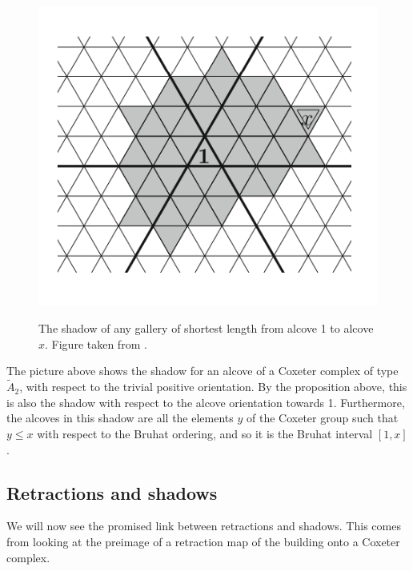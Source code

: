 \documentclass[11pt]{article}
\begin{document}
\begin{figure}[!htbp]
    
    \begin{center}
        \includegraphics[scale=0.6]{Screenshot 2023-03-07 133912.png}\\
    \end{center}
    \caption{The shadow of any gallery of shortest length from alcove 1 to alcove $x$. Figure taken from \cite[p.141]{SHA}.}
\end{figure}

\begin{example}
    The picture above shows the shadow for an alcove of a Coxeter complex of type $\tilde{A}_2$, with respect to the trivial positive orientation. By the proposition above, this is also the shadow with respect to the alcove orientation towards 1. Furthermore, the alcoves in this shadow are all the elements $y$ of the Coxeter group such that $y\leq x$ with respect to the Bruhat ordering, and so it is the Bruhat interval $[1,x]$. 
\end{example}

\subsection{Retractions and shadows}\label{retract}
We will now see the promised link between retractions and shadows. This comes from looking at the preimage of a retraction map of the building onto a Coxeter complex. 
\end{document}
